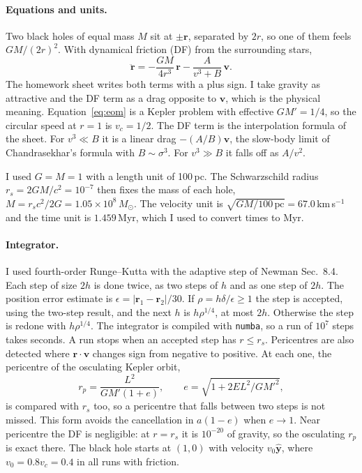 \documentclass[11pt]{article}
\newcommand{\code}[1]{\texttt{#1}}
\newcommand{\rs}{r_s}
\begin{document}
\paragraph{Equations and units.} Two black holes of equal mass $M$ sit at
$\pm\mathbf r$, separated by $2r$, so one of them feels $GM/(2r)^2$. With
dynamical friction (DF) from the surrounding stars,
\begin{equation}
\ddot{\mathbf r} = -\frac{GM}{4r^3}\,\mathbf r
  - \frac{A}{v^3+B}\,\mathbf v . \label{eq:eom}
\end{equation}
The homework sheet writes both terms with a plus sign. I take gravity as
attractive and the DF term as a drag opposite to $\mathbf v$, which is the
physical meaning. Equation~\eqref{eq:eom} is a Kepler problem with effective
$GM'=1/4$, so the circular speed at $r=1$ is $v_c=1/2$. The DF term is the
interpolation formula of the sheet. For $v^3\ll B$ it is a linear drag
$-(A/B)\mathbf v$, the slow-body limit of Chandrasekhar's formula with
$B\sim\sigma^3$. For $v^3\gg B$ it falls off as $A/v^2$.

I used $G=M=1$ with a length unit of 100\,pc. The Schwarzschild radius
$\rs = 2GM/c^2 = 10^{-7}$ then fixes the mass of each hole,
$M = \rs c^2/2G = 1.05\times10^8\,M_\odot$. The velocity unit is
$\sqrt{GM/100\,\mathrm{pc}} = 67.0$\,km\,s$^{-1}$ and the time unit is
$1.459$\,Myr, which I used to convert times to Myr.

\paragraph{Integrator.} I used fourth-order Runge--Kutta with the adaptive step
of Newman Sec.~8.4. Each step of size $2h$ is done twice, as two steps of $h$
and as one step of $2h$. The position error estimate is
$\epsilon = |\mathbf r_1-\mathbf r_2|/30$. If $\rho = h\delta/\epsilon \ge 1$
the step is accepted, using the two-step result, and the next $h$ is
$h\rho^{1/4}$, at most $2h$. Otherwise the step is redone with $h\rho^{1/4}$.
The integrator is compiled with \code{numba}, so a run of $10^7$ steps takes
seconds. A run stops when an accepted step has $r\le\rs$. Pericentres are also
detected where $\mathbf r\cdot\mathbf v$ changes sign from negative to positive.
At each one, the pericentre of the osculating Kepler orbit,
\begin{equation}
r_p = \frac{L^2}{GM'(1+e)},\qquad e=\sqrt{1+2EL^2/GM'^2},
\end{equation}
is compared with $\rs$ too, so a pericentre that falls between two steps is not
missed. This form avoids the cancellation in $a(1-e)$ when $e\to1$. Near
pericentre the DF is negligible: at $r=\rs$ it is $10^{-20}$ of gravity, so the
osculating $r_p$ is exact there. The black hole starts at $(1,0)$ with velocity
$v_0\hat{\mathbf y}$, where $v_0 = 0.8v_c=0.4$ in all runs with friction.
\end{document}
